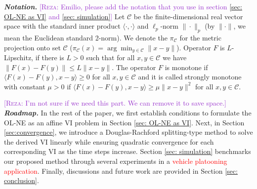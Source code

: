 \documentclass[letterpaper, 10 pt, conference]{ieeeconf}  %
\newcommand{\rezasay}[1]{\textcolor{DarkOrchid}{[\textsc{Reza:} #1]}}
\newcommand{\red}[1]{\textcolor{red}{#1}}
\begin{document}
\textit{\textbf{Notation.}} \rezasay{Emilio, please add the notation that you use in section \ref{sec: OL-NE as VI} and \ref{sec: simulation}}
Let $\mathcal{C}$ be the finite-dimensional real vector space with the standard inner product $\langle \cdot, \cdot \rangle$ and $\ell_p$-norm  $\|\cdot\|_p$ (by $\|\cdot\|$, we mean the Euclidean standard 2-norm).  We denote the $\pi_{\mathcal{C}}$ for the metric projection onto set $\mathcal{C}$ ($\pi_{\mathcal{C}}(x) = \arg\min_{y \in \mathcal{C}} \|x - y\|$). Operator $F$ is $L$-Lipschitz, if there is $L>0$ such that for all $x,y \in \mathcal{C}$ we have $\|F(x) - F(y)\| \leq L\|x-y\|$. The operator $F$ is monotone if $\langle F(x) - F(y), x - y \rangle \geq 0$ for all $x,y \in \mathcal{C}$ and it is called strongly monotone with constant $\mu > 0$ if 
$\langle F(x) - F(y), x - y \rangle \geq \mu \|x-y\|^2$ for all $x,y \in \mathcal{C}$.

\rezasay{I'm not sure if we need this part. We can remove it to save space.}\\
\textit{\textbf{Roadmap.}} In the rest of the paper, we first establish conditions to formulate the OL-NE as an affine VI problem in Section \ref{sec: OL-NE as VI}. Next, in Section \ref{sec:convergence}, we introduce a Douglas-Rachford splitting-type method to solve the derived VI linearly while ensuring quadratic convergence for each corresponding VI as the time steps increase. Section \ref{sec: simulation} benchmarks our proposed method through several experiments in a \red{vehicle platooning application}. Finally, discussions and future work are provided in Section \ref{sec: conclusion}.
\end{document}
